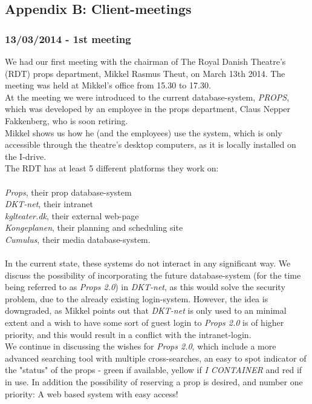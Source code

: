 \documentclass[12pt]{article}
\begin{document}
\subsection{Appendix B: Client-meetings}
\subsubsection{13/03/2014 - 1st meeting}
We had our first meeting with the chairman of The Royal Danish Theatre's (RDT) props department, Mikkel Rasmus Theut, on March 13th 2014. The meeting was held at Mikkel's office from 15.30 to 17.30. \\
At the meeting we were introduced to the current database-system, \textit{PROPS}, which was developed by an employee in the props department, Claus Nepper Fakkenberg, who is soon retiring.\\
Mikkel shows us how he (and the employees) use the system, which is only accessible through the theatre's desktop computers, as it is locally installed on the I-drive. \\
The RDT has at least 5 different platforms they work on: \\\\
\textit{Props}, their prop database-system \\
\textit{DKT-net}, their intranet \\
\textit{kglteater.dk}, their external web-page  \\
\textit{Kongeplanen}, their planning and scheduling site \\
\textit{Cumulus}, their media database-system. \\\\
In the current state, these systems do not interact in any significant way. We discuss the possibility of incorporating the future database-system (for the time being referred to as \textit{Props 2.0}) in \textit{DKT-net}, as this would solve the security problem, due to the already existing login-system. However, the idea is downgraded, as Mikkel points out that \textit{DKT-net} is only used to an minimal extent and a wish to have some sort of guest login to \textit{Props 2.0} is of higher priority, and this would result in a conflict with the intranet-login. \\
We continue in discussing the wishes for \textit{Props 2.0}, which include a more advanced searching tool with multiple cross-searches, an easy to spot indicator of the "status" of the props - green if available, yellow if \textit{I CONTAINER} and red if in use. In addition the possibility of reserving a prop is desired, and number one priority: A web based system with easy access! \\
\end{document}
